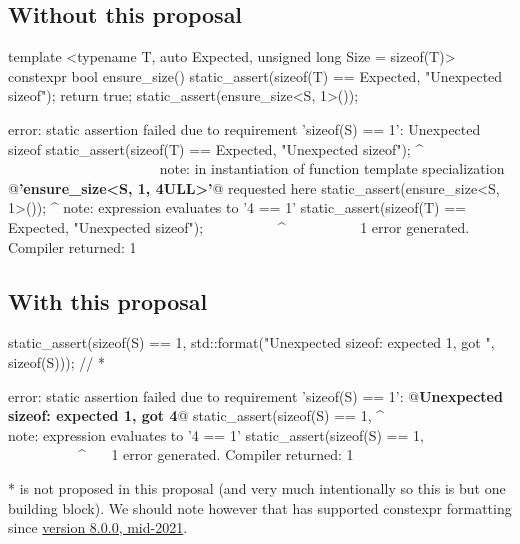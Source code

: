 \documentclass{wg21}
\begin{document}
\pagebreak
\subsection{Without this proposal}

\begin{colorblock}
template <typename T, auto Expected, unsigned long Size = sizeof(T)>
constexpr bool ensure_size() {
    static_assert(sizeof(T) == Expected, "Unexpected sizeof");
    return true;
}
static_assert(ensure_size<S, 1>());
\end{colorblock}

\begin{quoteblock}
\begin{codeblock}
error: static assertion failed due to requirement 'sizeof(S) == 1':
    Unexpected sizeof
static_assert(sizeof(T) == Expected, "Unexpected sizeof");
^             ~~~~~~~~~~~~~~~~~~~~~
note: in instantiation of function template specialization
    @\textbf{'ensure_size<S, 1, 4ULL>'}@ requested here
static_assert(ensure_size<S, 1>());
^
note: expression evaluates to '4 == 1'
static_assert(sizeof(T) == Expected, "Unexpected sizeof");
~~~~~~~~~~^~~~~~~~~~~
1 error generated.
Compiler returned: 1
\end{codeblock}
\end{quoteblock}

\subsection{With this proposal}

\begin{colorblock}
static_assert(sizeof(S) == 1,
    std::format("Unexpected sizeof: expected 1, got {}", sizeof(S))); // *
\end{colorblock}

\begin{quoteblock}
\begin{codeblock}
error: static assertion failed due to requirement 'sizeof(S) == 1':
    @\textbf{Unexpected sizeof: expected 1, got 4}@
static_assert(sizeof(S) == 1,
^             ~~~~~~~~~~~~~~
note: expression evaluates to '4 == 1'
static_assert(sizeof(S) == 1,
~~~~~~~~~~^~~~
1 error generated.
Compiler returned: 1
\end{codeblock}
\end{quoteblock}

*  is not proposed in this proposal (and very much intentionally so this is but one building block).
We should note however that  has supported constexpr formatting since \href{https://github.com/fmtlib/fmt/releases}{version 8.0.0, mid-2021}.
\end{document}
